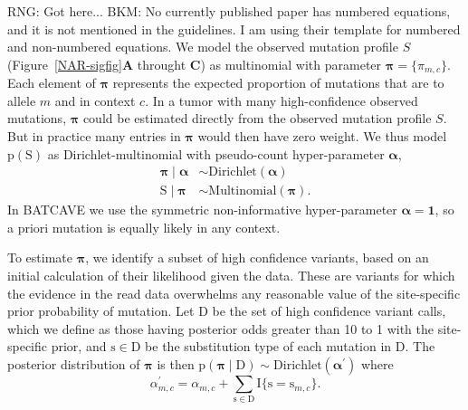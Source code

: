\documentclass[a4,center,fleqn]{NAR}
\newcommand{\rngcomment}[1]{{\color{red}RNG: #1}}
\newcommand{\bkmcomment}[1]{{\color{blue}BKM: #1}}
\newcommand{\batcave}{BATCAVE }
\begin{document}
\rngcomment{Got here...}
\bkmcomment{No currently published paper has numbered equations, and it is not mentioned in the guidelines. I am using their template for numbered and non-numbered equations.}
We model the observed mutation profile $S$ (Figure~\ref{NAR-sigfig}\textbf{A} throught \textbf{C}) as multinomial with parameter $\boldsymbol{\pi} = \{\pi_{m,c}\}$.
Each element of $\boldsymbol{\pi}$ represents the expected proportion of mutations that are to allele $m$ and in context $c$.
In a tumor with many high-confidence observed mutations, $\boldsymbol{\pi}$ could be estimated directly from the observed mutation profile $S$.
But in practice many entries in $\boldsymbol{\pi}$ would then have zero weight.
We thus model $\mathrm{p}(\mathrm{S})$ as Dirichlet-multinomial with pseudo-count hyper-parameter $\boldsymbol{\alpha}$, 
\begin{equation}
\begin{aligned}
  \boldsymbol{\pi} \mid \boldsymbol{\alpha} &\sim \textrm{Dirichlet}(\boldsymbol{\alpha}) \\
  \mathrm{S} \mid \boldsymbol{\pi} & \sim \textrm{Multinomial}(\boldsymbol{\pi}).
\end{aligned}
\end{equation}
In \batcave we use the symmetric non-informative hyper-parameter $\boldsymbol{\alpha} = \boldsymbol{1}$, so a priori mutation is equally likely in any context.

To estimate $\boldsymbol{\pi}$, we identify a subset of high confidence variants, based on an initial calculation of their likelihood given the data.
These are variants for which the evidence in the read data overwhelms any reasonable value of the site-specific prior probability of mutation.
Let $\mathrm{D}$ be the set of high confidence variant calls, which we define as those having posterior odds greater than 10 to 1 with the site-specific prior, and $\mathrm{s} \in \mathrm{D}$ be the substitution type of each mutation in $\mathrm{D}$.
The posterior distribution of $\boldsymbol{\pi}$ is then $\mathrm{p}(\boldsymbol{\pi} \mid \mathrm{D}) \sim \textrm{Dirichlet}(\boldsymbol{\alpha^{\prime}})$ where
\begin{equation}
    \alpha^{\prime}_{m,c} = \alpha_{m,c} + \sum\limits_{\mathrm{s} \in \mathrm{D}} \mathrm{I}\{\mathrm{s} = \mathrm{s}_{m,c}\}.
\end{equation}
\end{document}
